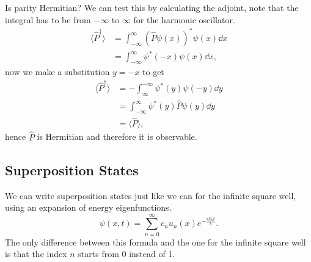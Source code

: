 \documentclass[../quantum_mechanics.tex]{subfiles}
\begin{document}
            Is parity Hermitian?
            We can test this by calculating the adjoint, note that the integral has to be from $-\infty$ to $\infty$ for the harmonic oscillator.
            \begin{align}
                \langle\hat{P}^\dagger\rangle&=\int_{-\infty}^\infty(\hat{P}\psi(x))^\ast\psi(x)\dd{x}\\
                &=\int_{-\infty}^\infty\psi^\ast(-x)\psi(x)\dd{x},
            \end{align}
            now we make a substitution $y=-x$ to get
            \begin{align}
                \langle\hat{P}^\dagger\rangle&=-\int_\infty^{-\infty}\psi^\ast(y)\psi(-y)\dd{y}\\
                &=\int_{-\infty}^\infty\psi^\ast(y)\hat{P}\psi(y)\dd{y}\\
                &=\langle\hat{P}\rangle,
            \end{align}
            hence $\hat{P}$ is Hermitian and therefore it is observable.

        \subsection{Superposition States}\label{chap:quantum-harmonic-oscillator:sec:energy-eigenstates:subsec:superposition-states}
            We can write superposition states just like we can for the infinite square well, using an expansion of energy eigenfunctions.
            \begin{equation}
                \psi(x,t)=\sum_{n=0}^\infty c_nu_n(x)e^{-\frac{iE_nt}{\hbar}}.
            \end{equation}
            The only difference between this formula and the one for the infinite square well is that the index $n$ starts from 0 instead of 1.
\end{document}
